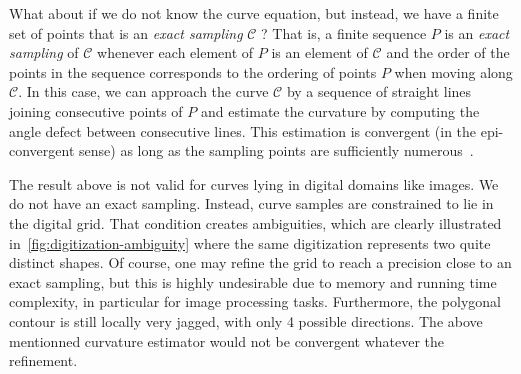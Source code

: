 \documentclass[review]{siamart220329}
\newcommand{\C}{\mathcal{C}} %
\begin{document}
What about if we do not know the curve equation, but instead, we have a finite
set of points that is an \emph{exact sampling} $\C$ ? That is, a finite sequence
$P$ is an {\em exact sampling} of $\C$ whenever each element of $P$ is an element
of $\C$ and the order of the points in the sequence corresponds to the ordering
of points $P$ when moving along $\C$. In this case, we can approach the curve $\C$
by a sequence of straight lines joining consecutive points of $P$ and estimate
the curvature by computing the angle defect between consecutive lines. This
estimation is convergent (in the epi-convergent sense) as long as the sampling
points are sufficiently
numerous~\cite{bruckstein01discrete,bruckstein01convergence}.

The result above is not valid for curves lying in digital domains like images.
We do not have an exact sampling. Instead, curve samples are constrained to lie
in the digital grid. That condition creates ambiguities, which are clearly
illustrated in~\cref{fig:digitization-ambiguity} where the same digitization
represents two quite distinct shapes. Of course, one may refine the grid to
reach a precision close to an exact sampling, but this is highly undesirable due
to memory and running time complexity, in particular for image processing tasks.
Furthermore, the polygonal contour is still locally very jagged, with only 4
possible directions. The above mentionned curvature estimator would not be
convergent whatever the refinement.
\end{document}
